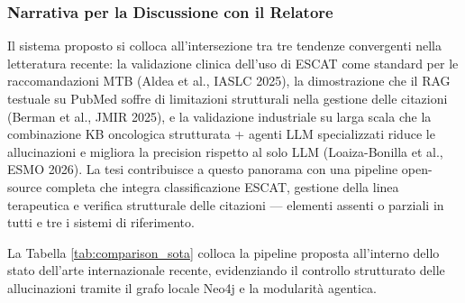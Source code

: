 \documentclass[11pt,a4paper]{article}
\begin{document}
\subsubsection*{Narrativa per la Discussione con il Relatore}
\begin{insightbox}
Il sistema proposto si colloca all'intersezione tra tre tendenze convergenti nella letteratura recente: la validazione clinica dell'uso di ESCAT come standard per le raccomandazioni MTB (Aldea et al., IASLC 2025), la dimostrazione che il RAG testuale su PubMed soffre di limitazioni strutturali nella gestione delle citazioni (Berman et al., JMIR 2025), e la validazione industriale su larga scala che la combinazione KB oncologica strutturata + agenti LLM specializzati riduce le allucinazioni e migliora la precision rispetto al solo LLM (Loaiza-Bonilla et al., ESMO 2026). La tesi contribuisce a questo panorama con una pipeline open-source completa che integra classificazione ESCAT, gestione della linea terapeutica e verifica strutturale delle citazioni --- elementi assenti o parziali in tutti e tre i sistemi di riferimento.
\end{insightbox}

La Tabella \ref{tab:comparison_sota} colloca la pipeline proposta all'interno dello stato dell'arte internazionale recente, evidenziando il controllo strutturato delle allucinazioni tramite il grafo locale Neo4j e la modularità agentica.
\end{document}
